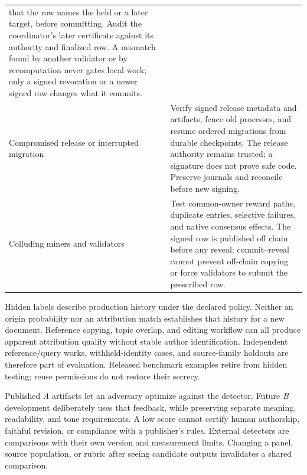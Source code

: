 \begin{longtable}{@{}>{\raggedright\arraybackslash}p{}>{\raggedright\arraybackslash}p{}@{}}
that the row names the held or a later target, before committing. Audit the
coordinator's later certificate against its authority and finalized row.
A mismatch found by another validator or by recomputation never gates local
work; only a signed revocation or a newer signed row changes what it commits. \\
Compromised release or interrupted migration & Verify signed release metadata
and artifacts, fence old processes, and resume ordered migrations from durable
checkpoints. The release authority remains trusted; a signature does not prove
safe code. Preserve journals and reconcile before new signing. \\
Colluding miners and validators & Test common-owner reward paths, duplicate
entries, selective failures, and native consensus effects. The signed row is
published off chain before any reveal; commit--reveal cannot prevent off-chain
copying or force validators to submit the prescribed row. \\
\end{longtable}

Hidden labels describe production history under the declared policy. Neither
an origin probability nor an attribution match establishes that history for a
new document. Reference copying, topic overlap, and editing workflow can all
produce apparent attribution quality without stable author identification.
Independent reference/query works, withheld-identity cases, and source-family
holdouts are therefore part of evaluation. Released benchmark examples retire
from hidden testing; reuse permissions do not restore their secrecy.

Published \textit{A} artifacts let an adversary optimize against the detector.
Future \textit{B} development deliberately uses that feedback, while preserving
separate meaning, readability, and tone requirements. A low score
cannot certify human authorship, faithful revision, or compliance with a
publisher's rules. External detectors are comparisons with their own version
and measurement limits. Changing a panel, source population, or rubric after
seeing candidate outputs invalidates a shared comparison.

